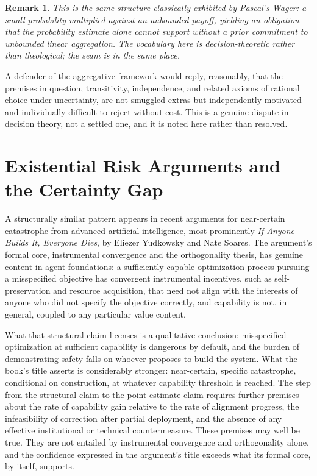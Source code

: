 \documentclass[11pt]{book}
\newtheorem{remark}[theorem]{Remark}
\begin{document}
\begin{remark}
This is the same structure classically exhibited by Pascal's Wager: a small probability multiplied against an unbounded payoff, yielding an obligation that the probability estimate alone cannot support without a prior commitment to unbounded linear aggregation. The vocabulary here is decision-theoretic rather than theological; the seam is in the same place.
\end{remark}

A defender of the aggregative framework would reply, reasonably, that the premises in question, transitivity, independence, and related axioms of rational choice under uncertainty, are not smuggled extras but independently motivated and individually difficult to reject without cost. This is a genuine dispute in decision theory, not a settled one, and it is noted here rather than resolved.

\section{Existential Risk Arguments and the Certainty Gap}

A structurally similar pattern appears in recent arguments for near-certain catastrophe from advanced artificial intelligence, most prominently \emph{If Anyone Builds It, Everyone Dies}, by Eliezer Yudkowsky and Nate Soares. The argument's formal core, instrumental convergence and the orthogonality thesis, has genuine content in agent foundations: a sufficiently capable optimization process pursuing a misspecified objective has convergent instrumental incentives, such as self-preservation and resource acquisition, that need not align with the interests of anyone who did not specify the objective correctly, and capability is not, in general, coupled to any particular value content.

What that structural claim licenses is a qualitative conclusion: misspecified optimization at sufficient capability is dangerous by default, and the burden of demonstrating safety falls on whoever proposes to build the system. What the book's title asserts is considerably stronger: near-certain, specific catastrophe, conditional on construction, at whatever capability threshold is reached. The step from the structural claim to the point-estimate claim requires further premises about the rate of capability gain relative to the rate of alignment progress, the infeasibility of correction after partial deployment, and the absence of any effective institutional or technical countermeasure. These premises may well be true. They are not entailed by instrumental convergence and orthogonality alone, and the confidence expressed in the argument's title exceeds what its formal core, by itself, supports.
\end{document}
